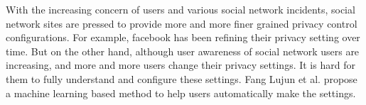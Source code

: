 \documentclass[a4paper]{article}
\begin{document}
With the increasing concern of users and various social network
incidents, social network sites are pressed to provide more and more
finer grained privacy control configurations. For example, facebook
has been refining their privacy setting over time. But on the other
hand, although user awareness of social network users are increasing,
and more and more users change their privacy settings. It is hard for
them to fully understand and configure these settings. Fang Lujun et
al. \cite{privacy-wizard} propose a machine learning based method to
help users automatically make the settings.



\end{document}
